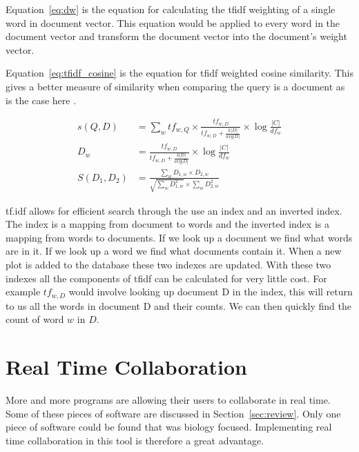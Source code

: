Equation~\ref{eq:dw} is the equation for calculating the \ac{tfidf} weighting of a single word in document vector.  This equation would be applied to every word in the document vector and transform the document vector into the document's weight vector.

Equation~\ref{eq:tfidf_cosine} is the equation for \ac{tfidf} weighted cosine similarity.  This gives a better measure of similarity when comparing the query is a document as is the case here .

\begin{subequations}
    \begin{align}
    s(Q, D) &= \sum_{w} tf_{w,Q} \times \frac{tf_{w,D}}{tf_{w,D} + \frac{k|D|}{avg|D|}} \times \log{\frac{|C|}{df_{w}}} \label{eq:tfidf}\\
    D_{w} &= \frac{tf_{w,D}}{tf_{w,D} + \frac{k|D|}{avg|D|}} \times \log{\frac{|C|}{df_{w}}} \label{eq:dw}\\
    S(D_{1}, D_{2}) &= \frac{\sum_{w} D_{1,w} \times D_{2,w}}{\sqrt{\sum_{w} D_{1,w}^2} \times \sum_{w} D_{2,w}^2} \label{eq:tfidf_cosine}
    \end{align}
\end{subequations}

\ac{tf.idf} allows for efficient search through the use an index and an inverted index.  The index is a mapping from document to words and the inverted index is a mapping from words to documents.  If we look up a document we find what words are in it.  If we look up a word we find what documents contain it.  When a new plot is added to the database these two indexes are updated.  With these two indexes all the components of \ac{tfidf} can be calculated for very little cost.  For example $tf_{w,D}$ would involve looking up document D in the index, this will return to us all the words in document D and their counts.  We can then quickly find the count of word $w$ in $D$.

\section{Real Time Collaboration}

More and more programs are allowing their users to collaborate in real time.  Some of these pieces of software are discussed in Section~\ref{sec:review}.  Only one piece of software could be found that was biology focused.  Implementing real time collaboration in this tool is therefore a great advantage.

